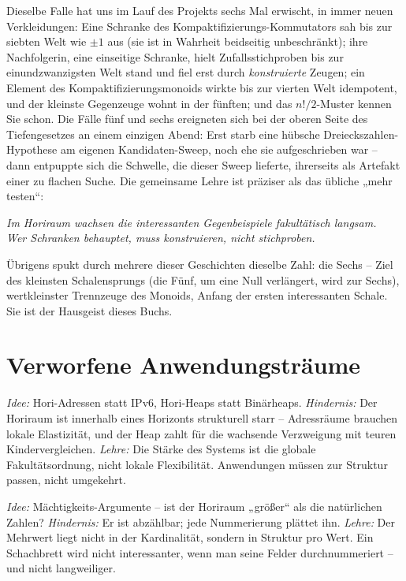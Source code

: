 Dieselbe Falle hat uns im Lauf des Projekts sechs Mal erwischt, in
immer neuen Verkleidungen: Eine Schranke des Kompaktifizierungs-Kommutators
sah bis zur siebten Welt wie $\pm1$ aus (sie ist in Wahrheit
beidseitig unbeschränkt); ihre Nachfolgerin, eine einseitige
Schranke, hielt Zufallsstichproben bis zur einundzwanzigsten Welt
stand und fiel erst durch \emph{konstruierte} Zeugen; ein Element
des Kompaktifizierungsmonoids wirkte bis zur vierten Welt
idempotent, und der kleinste Gegenzeuge wohnt in der fünften; und
das $n!/2$-Muster kennen Sie schon. Die Fälle fünf und sechs
ereigneten sich bei der oberen Seite des Tiefengesetzes an einem
einzigen Abend: Erst starb eine hübsche Dreieckszahlen-Hypothese am
eigenen Kandidaten-Sweep, noch ehe sie aufgeschrieben war -- dann
entpuppte sich die Schwelle, die dieser Sweep lieferte, ihrerseits
als Artefakt einer zu flachen Suche. Die gemeinsame Lehre ist
präziser als das übliche „mehr testen“:

\begin{center}
\emph{Im Horiraum wachsen die interessanten Gegenbeispiele
fakultätisch langsam.\\ Wer Schranken behauptet, muss konstruieren,
nicht stichproben.}
\end{center}

Übrigens spukt durch mehrere dieser Geschichten dieselbe Zahl:
die Sechs -- Ziel des kleinsten Schalensprungs (die Fünf, um eine
Null verlängert, wird zur Sechs), wertkleinster Trennzeuge des
Monoids, Anfang der ersten interessanten Schale. Sie ist der
Hausgeist dieses Buchs.

\section{Verworfene Anwendungsträume}

\begin{sackgasse}
\emph{Idee:} Hori-Adressen statt IPv6, Hori-Heaps statt Binärheaps.
\emph{Hindernis:} Der Horiraum ist innerhalb eines Horizonts
strukturell starr -- Adressräume brauchen lokale Elastizität, und
der Heap zahlt für die wachsende Verzweigung mit teuren
Kindervergleichen.
\emph{Lehre:} Die Stärke des Systems ist die globale
Fakultätsordnung, nicht lokale Flexibilität. Anwendungen müssen zur
Struktur passen, nicht umgekehrt.
\end{sackgasse}

\begin{sackgasse}
\emph{Idee:} Mächtigkeits-Argumente -- ist der Horiraum „größer“
als die natürlichen Zahlen?
\emph{Hindernis:} Er ist abzählbar; jede Nummerierung plättet ihn.
\emph{Lehre:} Der Mehrwert liegt nicht in der Kardinalität, sondern
in Struktur pro Wert. Ein Schachbrett wird nicht interessanter,
wenn man seine Felder durchnummeriert -- und nicht langweiliger.
\end{sackgasse}

